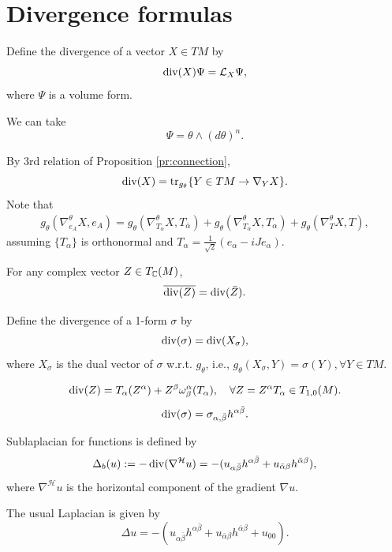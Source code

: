 \section{Divergence formulas}
\begin{definition}
    Define the divergence of a vector $X \in TM$  by 
    $$ \operatorname{div} (X) \Psi  = \mathcal{L}_{X} \Psi ,$$
    where $\Psi $ is a volume form. 
\end{definition}
\begin{remark}
   We can take 
   $$ \Psi = \theta \wedge (d \theta )^n .$$ 
\end{remark}
\begin{remark}
    By 3rd relation of Proposition \ref{pr:connection}, 
   $$ \operatorname{div} (X)= \operatorname{tr}_{g_{\theta }}\{Y \in TM \to \nabla _{Y}X\} .$$ 
   Note that 
   $$ \begin{aligned}
   g_{\theta }(\nabla ^{\theta }_{e_{A}}X,e_{A})= g_{\theta }(\nabla ^{\theta }_{T_{\alpha }}X,T_{\bar \alpha })+g_{\theta }(\nabla ^{\theta }_{T_{\bar\alpha }}X,T_{ \alpha })+g_{\theta }(\nabla ^{\theta }_{T}X,T),
   \end{aligned}  $$
   assuming $\{T_{\alpha }\} $ is orthonormal and $T_{\alpha }=\frac{1}{\sqrt{2}}(e_{\alpha }-iJ e_{\alpha }) $.  
\end{remark}
\begin{exercise}
    For any complex vector $Z \in T_{{\mathbb C}}(M)$, 
    $$ \overline{\operatorname{div} (Z)}=\operatorname{div} (\bar{Z}) .$$
\end{exercise}
\begin{definition}
    Define  the divergence of a 1-form $\sigma $ by 
    $$ \operatorname{div} (\sigma )=\operatorname{div} (X_{\sigma }), $$ 
    where $X_{\sigma }$ is the dual vector of $\sigma $ w.r.t. $g_{\theta }$, i.e., $g_{\theta }(X_{\sigma },Y)=\sigma (Y), \forall  Y \in TM $.    
\end{definition}
\begin{exercise}
$$ \operatorname{div} (Z)=T_{\alpha }(Z^{\alpha })+Z^{\beta } \omega _{\beta }^{\alpha }(T_{\alpha }), \quad \forall  Z=Z^{\alpha }T_{\alpha }\in T_{1,0}(M).$$
$$ \operatorname{div} (\sigma )=\sigma _{\alpha ,\bar{\beta }}h^{\alpha \bar{\beta }}. $$
\end{exercise}

\begin{definition}
    Sublaplacian for functions is defined by 
    $$ \Delta _b(u):=-\operatorname{div}(\nabla^{\mathcal{H}} u)=-(u_{\alpha \bar{\beta }}h^{\alpha \bar{\beta }}+u_{\bar{\alpha }\beta }h^{\bar{\alpha }\beta }) ,$$
    where $\nabla ^{\mathcal{H}}u$ is the horizontal component of the gradient $\nabla u$.  
\end{definition}
\begin{exercise}
    The usual Laplacian is given by 
    $$ \Delta  u= -(u_{\alpha \bar{\beta }}h^{\alpha \bar{\beta }}+u_{\bar{\alpha }\beta }h^{\bar{\alpha }\beta }+u_{00}). $$
\end{exercise}










